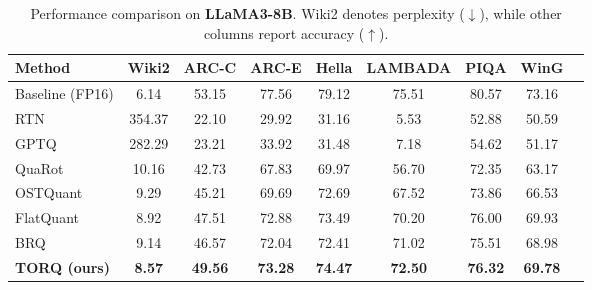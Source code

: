 \begin{table}[h!]
\centering
\caption{Performance comparison on \textbf{LLaMA3-8B}. Wiki2 denotes perplexity ($\downarrow$), while other columns report accuracy ($\uparrow$).}
\label{tab:llama3_8b_full}
\begin{tabular}{lcccccccc}
\toprule
\textbf{Method} & \textbf{Wiki2} & \textbf{ARC-C} & \textbf{ARC-E} & \textbf{Hella} & \textbf{LAMBADA} & \textbf{PIQA} & \textbf{WinG} \\
\midrule
Baseline (FP16) & 6.14 & 53.15 & 77.56 & 79.12 & 75.51 & 80.57 & 73.16 \\
\midrule
RTN & 354.37 & 22.10 & 29.92 & 31.16 & 5.53 & 52.88 & 50.59 \\
GPTQ & 282.29 & 23.21 & 33.92 & 31.48 & 7.18 & 54.62 & 51.17 \\
QuaRot & 10.16 & 42.73 & 67.83 & 69.97 & 56.70 & 72.35 & 63.17 \\
OSTQuant & 9.29 & 45.21 & 69.69 & 72.69 & 67.52 & 73.86 & 66.53 \\
FlatQuant & 8.92 & 47.51 & 72.88 & 73.49 & 70.20 & 76.00 & 69.93 \\
BRQ & 9.14 & 46.57 & 72.04 & 72.41 & 71.02 & 75.51 & 68.98 \\
\textbf{TORQ (ours)} & \textbf{8.57} & \textbf{49.56} & \textbf{73.28} & \textbf{74.47} & \textbf{72.50} & \textbf{76.32} & \textbf{69.78} \\
\bottomrule
\end{tabular}
\end{table}